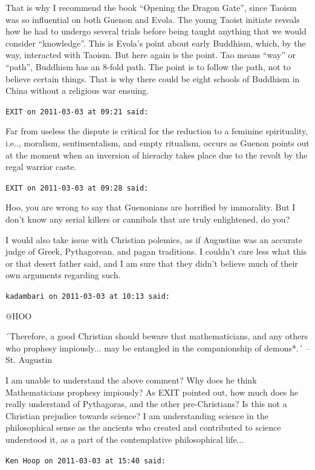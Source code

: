 \begin{footnotesize}
\begin{sffamily}
That is why I recommend the book ``Opening the Dragon Gate'', since Taoism was so influential on both Guenon and Evola. The young Taoist initiate reveals how he had to undergo several trials before being taught anything that we would consider ``knowledge''. This is Evola's point about early Buddhism, which, by the way, interacted with Taoism. But here again is the point. Tao means ``way'' or ``path'', Buddhism has an 8-fold path. The point is to follow the path, not to believe certain things. That is why there could be eight schools of Buddhism in China without a religious war ensuing.

\hfill

\texttt{EXIT on 2011-03-03 at 09:21 said:}

Far from useless the dispute is critical for the reduction to a feminine spirituality, i.e.., moralism, sentimentalism, and empty ritualism, occurs as Guenon points out at the moment when an inversion of hierachy takes place due to the revolt by the regal warrior caste.

\hfill

\texttt{EXIT on 2011-03-03 at 09:28 said:}

Hoo, you are wrong to say that Guenonians are horrified by immorality. But I don't know any serial killers or cannibals that are truly enlightened, do you?

I would also take issue with Christian polemics, as if Augustine was an accurate judge of Greek, Pythagorean, and pagan traditions. I couldn't care less what this or that desert father said, and I am sure that they didn't believe much of their own arguments regarding such.

\hfill

\texttt{kadambari on 2011-03-03 at 10:13 said:}

@HOO

´Therefore, a good Christian should beware that mathematicians, and any others who prophesy impiously... may be entangled in the companionship of demons*.´ -- St. Augustin

I am unable to understand the above comment? Why does he think Mathematicians prophesy impiously? As EXIT pointed out, how much does he really understand of Pythagoras, and the other pre-Christians? Is this not a Christian prejudice towards science? I am understanding science in the philosophical sense as the ancients who created and contributed to science understood it, as a part of the contemplative philosophical life... \hfill

\texttt{Ken Hoop on 2011-03-03 at 15:40 said:}


\end{sffamily}
\end{footnotesize}
